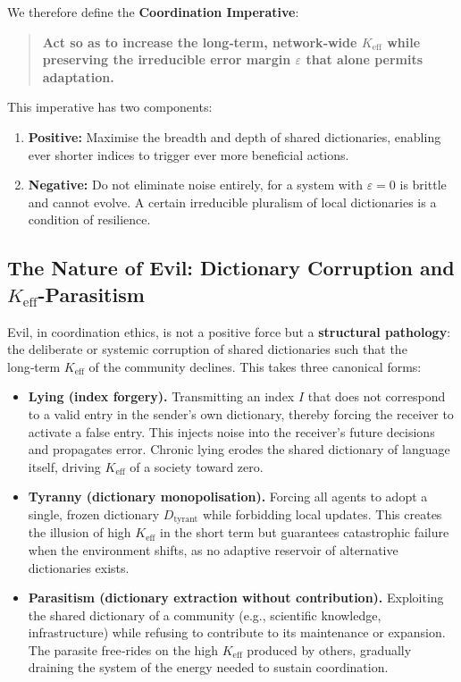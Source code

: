 \documentclass[12pt,a4paper]{article}
\begin{document}
	We therefore define the \textbf{Coordination Imperative}:
	
	\begin{quote}
		\textbf{Act so as to increase the long‑term, network‑wide $K_{\mathrm{eff}}$ while preserving the irreducible error margin $\varepsilon$ that alone permits adaptation.}
	\end{quote}
	
	This imperative has two components:
	\begin{enumerate}[leftmargin=*]
		\item \textbf{Positive:} Maximise the breadth and depth of shared dictionaries, enabling ever shorter indices to trigger ever more beneficial actions.
		\item \textbf{Negative:} Do not eliminate noise entirely, for a system with $\varepsilon = 0$ is brittle and cannot evolve. A certain irreducible pluralism of local dictionaries is a condition of resilience.
	\end{enumerate}
	
	\subsection{The Nature of Evil: Dictionary Corruption and $K_{\mathrm{eff}}$-Parasitism}
	
	Evil, in coordination ethics, is not a positive force but a \textbf{structural pathology}: the deliberate or systemic corruption of shared dictionaries such that the long‑term $K_{\mathrm{eff}}$ of the community declines. This takes three canonical forms:
	
	\begin{itemize}[leftmargin=*]
		\item \textbf{Lying (index forgery).} Transmitting an index $I$ that does not correspond to a valid entry in the sender’s own dictionary, thereby forcing the receiver to activate a false entry. This injects noise into the receiver’s future decisions and propagates error. Chronic lying erodes the shared dictionary of language itself, driving $K_{\mathrm{eff}}$ of a society toward zero.
		\item \textbf{Tyranny (dictionary monopolisation).} Forcing all agents to adopt a single, frozen dictionary $D_{\text{tyrant}}$ while forbidding local updates. This creates the illusion of high $K_{\mathrm{eff}}$ in the short term but guarantees catastrophic failure when the environment shifts, as no adaptive reservoir of alternative dictionaries exists.
		\item \textbf{Parasitism (dictionary extraction without contribution).} Exploiting the shared dictionary of a community (e.g., scientific knowledge, infrastructure) while refusing to contribute to its maintenance or expansion. The parasite free‑rides on the high $K_{\mathrm{eff}}$ produced by others, gradually draining the system of the energy needed to sustain coordination.
	\end{itemize}
	
\end{document}

